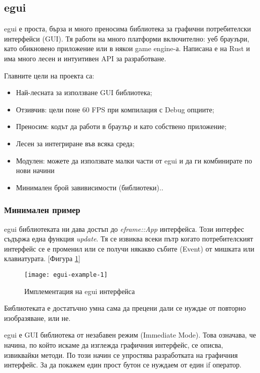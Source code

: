 \subsection{egui}
egui е проста, бърза и много преносима библиотека за графични потребителски
интерфейси (GUI). Тя работи на много платформи включително: уеб браузъри, като
обикновено приложение или в някои game engine-а. Написана е на Rust и има много
лесен и интуитивен API за разработване.

Главните цели на проекта са:
\begin{itemize}
    \item Най-лесната за използване GUI библиотека;
    \item Отзивчив: цели поне 60 FPS при компилация с Debug опциите;
    \item Преносим: кодът да работи в браузър и като собствено приложение;
    \item Лесен за интегриране във всяка среда;
    \item Модулен: можете да използвате малки части от egui и да ги комбинирате
    по нови начини \item Минимален брой завивисимости (библиотеки)..
\end{itemize}

\subsubsection{Минимален пример}
egui библиотеката ни дава достъп до \textit{eframe::App} интерфейса. Този интерфес съдържа една
функция \textit{update}. Тя се извиква всеки пътр когато потребителският интерфейс се е
променил или се получи някакво събите (Event) от мишката или клавиатурата. 
[Фигура \ref{fig:egui-example-1}]

\begin{figure}[!htb]
  \texttt{[image: egui-example-1]}
  \centering
  \caption{Имплементация на egui интерфейса}
  \label{fig:egui-example-1}
\end{figure}

Библиотеката е достатъчно умна сама да прецени дали се нуждае от повторно
изобразяване, или не.

egui е GUI библиотека от незабавен режим (Immediate Mode). Това означава, че
начина, по който искаме да изглежда графичния интерфейс, се описва, извиквайки
методи. По този начин се упростява разработката на графичния интерфейс. За да покажем един прост
бутон се нуждаем от един if оператор.
